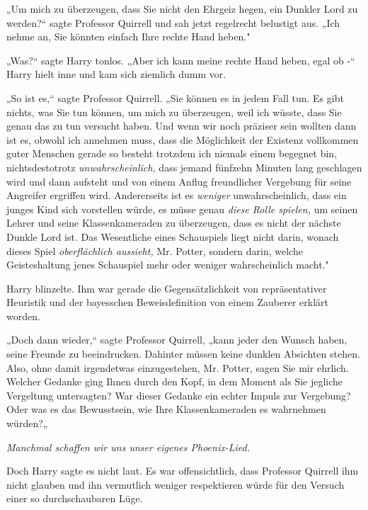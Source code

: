 {„Um mich zu überzeugen, dass Sie nicht den Ehrgeiz hegen, ein Dunkler Lord zu werden?“ sagte Professor Quirrell und sah jetzt regelrecht belustigt aus. „Ich nehme an, Sie könnten einfach Ihre rechte Hand heben."

„Was?“ sagte Harry tonlos. „Aber ich kann meine rechte Hand heben, egal ob -“ Harry hielt inne und kam sich ziemlich dumm vor.

„So ist es,“ sagte Professor Quirrell. „Sie können es in jedem Fall tun. Es gibt nichts, was Sie tun können, um mich zu überzeugen, weil ich wüsste, dass Sie genau das zu tun versucht haben. Und wenn wir noch präziser sein wollten dann ist es, obwohl ich annehmen muss, dass die Möglichkeit der Existenz vollkommen guter Menschen gerade so besteht trotzdem ich niemals einem begegnet bin, nichtsdestotrotz \emph{unwahrscheinlich,} dass jemand fünfzehn Minuten lang geschlagen wird und dann aufsteht und von einem Anflug freundlicher Vergebung für seine Angreifer ergriffen wird. Andererseits ist es \emph{weniger} unwahrscheinlich, dass ein junges Kind sich vorstellen würde, es müsse genau \emph{diese Rolle spielen,} um seinen Lehrer und seine Klassenkameraden zu überzeugen, dass es nicht der nächste Dunkle Lord ist. Das Wesentliche eines Schauspiels liegt nicht darin, wonach dieses Spiel \emph{oberflächlich aussieht,} Mr. Potter, sondern darin, welche Geisteshaltung jenes Schauspiel mehr oder weniger wahrscheinlich macht."

Harry blinzelte. Ihm war gerade die Gegensätzlichkeit von repräsentativer Heuristik und der bayesschen Beweisdefinition von einem Zauberer erklärt worden.

„Doch dann wieder,“ sagte Professor Quirrell, „kann jeder den Wunsch haben, seine Freunde zu beeindrucken. Dahinter müssen keine dunklen Absichten stehen. Also, ohne damit irgendetwas einzugestehen, Mr. Potter, sagen Sie mir ehrlich. Welcher Gedanke ging Ihnen durch den Kopf, in dem Moment als Sie jegliche Vergeltung untersagten? War dieser Gedanke ein echter Impuls zur Vergebung? Oder was es das Bewusstsein, wie Ihre Klassenkameraden es wahrnehmen würden?„

\emph{Manchmal schaffen wir uns unser eigenes Phoenix-Lied.}

Doch Harry sagte es nicht laut. Es war offensichtlich, dass Professor Quirrell ihm nicht glauben und ihn vermutlich weniger respektieren würde für den Versuch einer so durchschaubaren Lüge.

}
